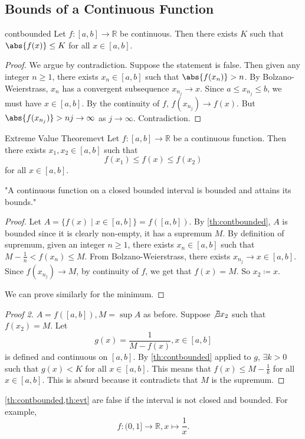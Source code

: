 \subsection{Bounds of a Continuous Function}
\leavevmode
\begin{theorem}{}{contbounded}
    Let \(f:[a,b] \to \mathbb{R}\) be continuous. Then there exists \(K\) such that \(\abs{f(x)} \leq K\) for all \(x \in [a,b]\).
\end{theorem}
\begin{proof}
    We argue by contradiction. Suppose the statement is false. Then given any integer \(n \geq 1\), there exists \(x_n \in [a,b]\) such that \(\abs{f(x_n)}  > n\). By Bolzano-Weierstrass, \(x_n\) has a convergent subsequence \(x_{n_j} \to x\). Since \(a \leq x_{n_j} \leq b\), we must have \(x \in [a,b]\). By the continuity of \(f\), \(f(x_{n_j}) \to f(x)\). But \(\abs{f(x_{n_j})} > nj \to \infty\) as \(j\to \infty\). Contradiction.
\end{proof}
\begin{theorem}{Extreme Value Theorem}{evt}
    Let \(f:[a,b] \to \mathbb{R}\) be a continuous function. Then there exists \(x_1, x_2 \in [a,b]\) such that
    \[
        f(x_1) \leq f(x) \leq f(x_2)
    \]
    for all \(x \in [a,b]\).
    
    "A continuous function on a closed bounded interval is bounded and attains its bounds."
\end{theorem}
\begin{proof}
    Let \(A = \{f(x)\mid x \in [a,b]\} = f([a,b])\). By \cref{th:contbounded}, \(A\) is bounded since it is clearly non-empty, it has a supremum \(M\). By definition of supremum, given an integer \(n\geq 1\), there exists \(x_n \in [a,b]\) such that \(M-\frac{1}{n}<f(x_n) \leq M\). From Bolzano-Weierstrass, there exists \(x_{n_j} \to x \in [a,b]\). Since \(f(x_{n_j}) \to M\), by continuity of \(f\), we get that \(f(x) = M\). So \(x_2\coloneqq x\).

    We can prove similarly for the minimum.
\end{proof}
\begin{proof}[Proof 2]
    \(A = f([a,b]), M = \sup A\) as before. Suppose \(\not\exists x_2\) such that \(f(x_2) = M\). Let
    \[g(x) = \frac{1}{M - f(x)}, x \in [a,b]\]
    is defined and continuous on \([a,b]\). By \cref{th:contbounded} applied to \(g\), \(\exists k >0\) such that \(g(x) < K\) for all \(x \in [a,b]\). This means that \(f(x) \leq M - \frac{1}{k}\) for all \(x \in [a,b]\). This is absurd because it contradicts that \(M\) is the supremum.
\end{proof}
\begin{note}
    \cref{th:contbounded,th:evt} are false if the interval is not closed and bounded. For example,
    \[
        f: (0,1] \to \mathbb{R}, x \mapsto \frac{1}{x}.
    \]
\end{note}
